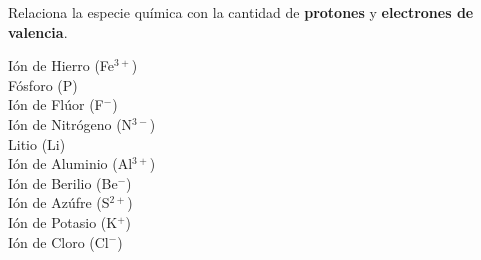 Relaciona la especie química con la cantidad de \textbf{protones} y \textbf{electrones de valencia}.

\begin{multicols}{3}
    \begin{choices}
        \choice Ión de Hierro (Fe$^{3+}$)  \\  
        \choice Fósforo (P)    \\  
        \choice Ión de Flúor   (F$^-$) \\  
      \columnbreak%
      \choice Ión de Nitrógeno (N$^{3-}$) \\  
        \choice Litio (Li) \\ 
        \choice Ión de Aluminio  (Al$^{3+}$) \\ 
        \choice Ión de Berilio (Be$^{-}$) \\  
        \columnbreak%
        \choice Ión de Azúfre (S$^{2+}$) \\ 
        \choice Ión de Potasio (K$^+$) \\ 
        \choice Ión de Cloro (Cl$^{-}$) \\ 
    \end{choices}
\end{multicols}

